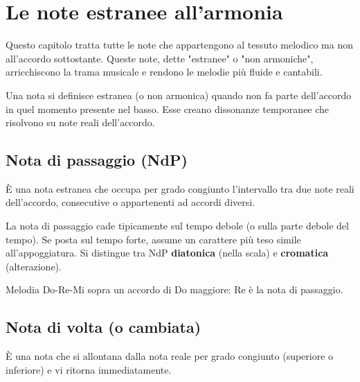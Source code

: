 \chapter{Le note estranee all'armonia}
\label{chap:noteestranee}

Questo capitolo tratta tutte le note che appartengono al tessuto melodico ma non all'accordo sottostante. Queste note, dette "estranee" o "non armoniche", arricchiscono la trama musicale e rendono le melodie più fluide e cantabili.

\begin{definizione}
    \label{def:nota_estranea}
    Una nota si definisce estranea (o non armonica) quando non fa parte dell'accordo in quel momento presente nel basso. Esse creano dissonanze temporanee che risolvono su note reali dell'accordo.
\end{definizione}

\section{Nota di passaggio (NdP)}
\label{sec:nota_passaggio}

\begin{definizione}
    È una nota estranea che occupa per grado congiunto l'intervallo tra due note reali dell'accordo, consecutive o appartenenti ad accordi diversi.
\end{definizione}

\begin{regola}
    La nota di passaggio cade tipicamente sul tempo debole (o sulla parte debole del tempo). Se posta sul tempo forte, assume un carattere più teso simile all'appoggiatura. Si distingue tra NdP \textbf{diatonica} (nella scala) e \textbf{cromatica} (alterazione).
\end{regola}

\begin{esempio}
    Melodia Do-Re-Mi sopra un accordo di Do maggiore: Re è la nota di passaggio.
\end{esempio}

\section{Nota di volta (o cambiata)}
\label{sec:nota_volta}

\begin{definizione}
    È una nota che si allontana dalla nota reale per grado congiunto (superiore o inferiore) e vi ritorna immediatamente.
\end{definizione}

